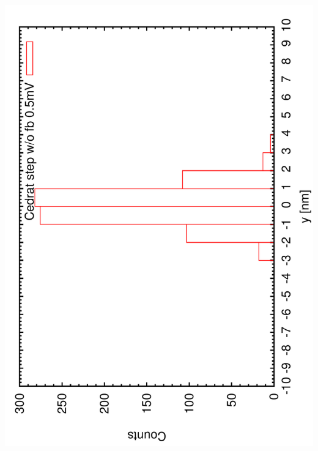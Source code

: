 \documentclass[a4paper,11pt]{book}
\begin{document}
\includegraphics[angle=-90,scale=0.20]{imagestep31.pdf}
\end{document}
